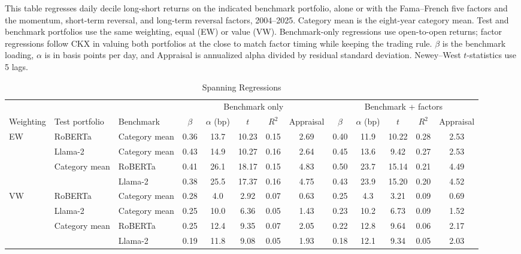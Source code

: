 \begin{table}[htbp]
\centering
\caption{Spanning Regressions}
\label{tab:tabA_spanning}
\begin{minipage}{\linewidth}\footnotesize
This table regresses daily decile long-short returns on the indicated benchmark portfolio, alone or with the Fama--French five factors and the momentum, short-term reversal, and long-term reversal factors, 2004--2025. Category mean is the eight-year category mean. Test and benchmark portfolios use the same weighting, equal (EW) or value (VW). Benchmark-only regressions use open-to-open returns; factor regressions follow CKX in valuing both portfolios at the close to match factor timing while keeping the trading rule. $\beta$ is the benchmark loading, $\alpha$ is in basis points per day, and Appraisal is annualized alpha divided by residual standard deviation. Newey--West $t$-statistics use 5 lags.
\end{minipage}
\medskip

{\footnotesize
\begin{adjustbox}{max width=\linewidth, max totalheight=0.75\textheight}
\begin{tabular}{lllcccccccccc}
\toprule
\multicolumn{3}{c}{} & \multicolumn{5}{c}{Benchmark only} & \multicolumn{5}{c}{Benchmark + factors} \\
\cmidrule(lr){4-8} \cmidrule(lr){9-13}
Weighting & Test portfolio & Benchmark & $\beta$ & $\alpha$ (bp) & $t$ & $R^2$ & Appraisal & $\beta$ & $\alpha$ (bp) & $t$ & $R^2$ & Appraisal \\
\midrule
EW & RoBERTa & Category mean & 0.36 & 13.7 & 10.23 & 0.15 & 2.69 & 0.40 & 11.9 & 10.22 & 0.28 & 2.53 \\
\cmidrule(lr){2-13}
 & Llama-2 & Category mean & 0.43 & 14.9 & 10.27 & 0.16 & 2.64 & 0.45 & 13.6 & \phantom{0}9.42 & 0.27 & 2.53 \\
\cmidrule(lr){2-13}
 & Category mean & RoBERTa & 0.41 & 26.1 & 18.17 & 0.15 & 4.83 & 0.50 & 23.7 & 15.14 & 0.21 & 4.49 \\
 &  & Llama-2 & 0.38 & 25.5 & 17.37 & 0.16 & 4.75 & 0.43 & 23.9 & 15.20 & 0.20 & 4.52 \\
\midrule
VW & RoBERTa & Category mean & 0.28 & \phantom{0}4.0 & \phantom{0}2.92 & 0.07 & 0.63 & 0.25 & \phantom{0}4.3 & \phantom{0}3.21 & 0.09 & 0.69 \\
\cmidrule(lr){2-13}
 & Llama-2 & Category mean & 0.25 & 10.0 & \phantom{0}6.36 & 0.05 & 1.43 & 0.23 & 10.2 & \phantom{0}6.73 & 0.09 & 1.52 \\
\cmidrule(lr){2-13}
 & Category mean & RoBERTa & 0.25 & 12.4 & \phantom{0}9.35 & 0.07 & 2.05 & 0.22 & 12.8 & \phantom{0}9.64 & 0.06 & 2.17 \\
 &  & Llama-2 & 0.19 & 11.8 & \phantom{0}9.08 & 0.05 & 1.93 & 0.18 & 12.1 & \phantom{0}9.34 & 0.05 & 2.03 \\
\bottomrule
\end{tabular}
\end{adjustbox}
}
\end{table}
